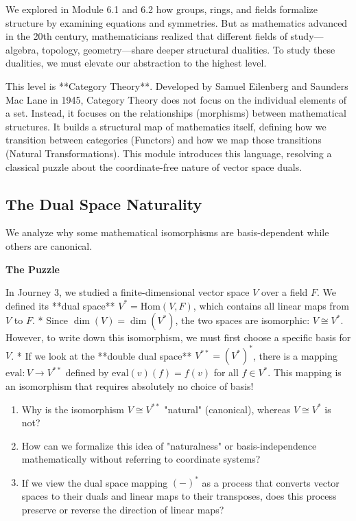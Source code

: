 \documentclass[12pt, a4paper]{article}
\newenvironment{puzzlebox}
  {\par\medskip\fillcolorbox{LightGold}{PuzzleColor}{The Puzzle}}
  {\par\medskip}
\newcommand{\fillcolorbox}[3]{%
  \noindent
  \filldrawbox{#1}{#2}{\textbf{\sffamily\color{white}#3}}\par\nobreak\vspace{4pt}
}
\newcommand{\filldrawbox}[3]{%
  \colorbox{#1}{\parbox{\dimexpr\linewidth-2\fboxsep\relax}{%
    \vspace{4pt}\noindent\hspace{4pt}#3\vspace{4pt}%
  }}%
}
\begin{document}
We explored in Module 6.1 and 6.2 how groups, rings, and fields formalize structure by examining equations and symmetries.
But as mathematics advanced in the 20th century, mathematicians realized that different fields of study—algebra, topology, geometry—share deeper structural dualities.
To study these dualities, we must elevate our abstraction to the highest level.

This level is **Category Theory**.
Developed by Samuel Eilenberg and Saunders Mac Lane in 1945, Category Theory does not focus on the individual elements of a set.
Instead, it focuses on the relationships (morphisms) between mathematical structures.
It builds a structural map of mathematics itself, defining how we transition between categories (Functors) and how we map those transitions (Natural Transformations).
This module introduces this language, resolving a classical puzzle about the coordinate-free nature of vector space duals.

\subsection{The Dual Space Naturality}

We analyze why some mathematical isomorphisms are basis-dependent while others are canonical.

\begin{puzzlebox}
In Journey 3, we studied a finite-dimensional vector space $V$ over a field $F$.
We defined its **dual space** $V^* = \text{Hom}(V, F)$, which contains all linear maps from $V$ to $F$.
* Since $\dim(V) = \dim(V^*)$, the two spaces are isomorphic: $V \cong V^*$. However, to write down this isomorphism, we must first choose a specific basis for $V$.
* If we look at the **double dual space** $V^{**} = (V^*)^*$, there is a mapping $\text{eval}: V \to V^{**}$ defined by $\text{eval}(v)(f) = f(v)$ for all $f \in V^*$. This mapping is an isomorphism that requires absolutely no choice of basis!
\begin{enumerate}[label=(\alph*), leftmargin=*]
  \item Why is the isomorphism $V \cong V^{**}$ "natural" (canonical), whereas $V \cong V^*$ is not?
  \item How can we formalize this idea of "naturalness" or basis-independence mathematically without referring to coordinate systems?
  \item If we view the dual space mapping $(-)^*$ as a process that converts vector spaces to their duals and linear maps to their transposes, does this process preserve or reverse the direction of linear maps?
\end{enumerate}
\end{puzzlebox}
\end{document}
